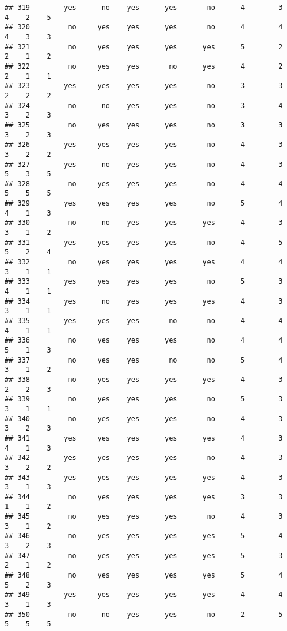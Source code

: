 \documentclass[
]{article}
\begin{document}
\begin{verbatim}
## 319        yes      no    yes      yes       no      4        3     4    2    5
## 320         no     yes    yes      yes       no      4        4     4    3    3
## 321         no     yes    yes      yes      yes      5        2     2    1    2
## 322         no     yes    yes       no      yes      4        2     2    1    1
## 323        yes     yes    yes      yes       no      3        3     2    2    2
## 324         no      no    yes      yes       no      3        4     3    2    3
## 325         no     yes    yes      yes       no      3        3     3    2    3
## 326        yes     yes    yes      yes       no      4        3     3    2    2
## 327        yes      no    yes      yes       no      4        3     5    3    5
## 328         no     yes    yes      yes       no      4        4     5    5    5
## 329        yes     yes    yes      yes       no      5        4     4    1    3
## 330         no      no    yes      yes      yes      4        3     3    1    2
## 331        yes     yes    yes      yes       no      4        5     5    2    4
## 332         no     yes    yes      yes      yes      4        4     3    1    1
## 333        yes     yes    yes      yes       no      5        3     4    1    1
## 334        yes      no    yes      yes      yes      4        3     3    1    1
## 335        yes     yes    yes       no       no      4        4     4    1    1
## 336         no     yes    yes      yes       no      4        4     5    1    3
## 337         no     yes    yes       no       no      5        4     3    1    2
## 338         no     yes    yes      yes      yes      4        3     2    2    3
## 339         no     yes    yes      yes       no      5        3     3    1    1
## 340         no     yes    yes      yes       no      4        3     3    2    3
## 341        yes     yes    yes      yes      yes      4        3     4    1    3
## 342        yes     yes    yes      yes       no      4        3     3    2    2
## 343        yes     yes    yes      yes      yes      4        3     3    1    3
## 344         no     yes    yes      yes      yes      3        3     1    1    2
## 345         no     yes    yes      yes       no      4        3     3    1    2
## 346         no     yes    yes      yes      yes      5        4     3    2    3
## 347         no     yes    yes      yes      yes      5        3     2    1    2
## 348         no     yes    yes      yes      yes      5        4     5    2    3
## 349        yes     yes    yes      yes      yes      4        4     3    1    3
## 350         no      no    yes      yes       no      2        5     5    5    5

\end{verbatim}
\end{document}
